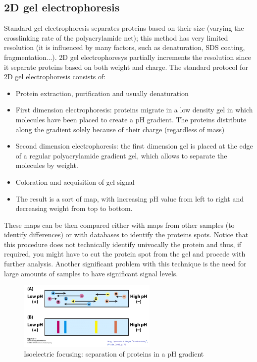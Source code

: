     \subsection{2D gel electrophoresis}
      Standard gel electrophoresis separates proteins based on their size (varying the crosslinking rate of the polyacrylamide net); this method has very limited resolution (it is influenced by many factors, such as denaturation, SDS coating, fragmentation...).
      2D gel electrophoresys partially increments the resolution since it separate proteins based on both weight and charge.
      The standard protocol for 2D gel electrophoresis consists of:
      \begin{itemize}
        \item Protein extraction, purification and usually denaturation
        \item First dimension electrophoresis: proteins migrate in a low density gel in which molecules have been placed to create a pH gradient. The proteins distribute along the gradient solely because of their charge (regardless of mass)
        \item Second dimension electrophoresis: the first dimension gel is placed at the edge of a regular polyacrylamide gradient gel, which allows to separate the molecules by weight. 
        \item Coloration and acquisition of gel signal
        \item The result is a sort of map, with increasing pH value from left to right and decreasing weight from top to bottom.
      \end{itemize}
      These maps can be then compared either with maps from other samples (to identify differences) or with databases to identify the proteins spots. Notice that this procedure does not technically identify univocally the protein and thus, if required, you might have to cut the protein spot from the gel and procede with further analysis. Another significant problem with this technique is the need for large amounts of samples to have significant signal levels.

      \begin{figure}[ht]
      \caption{Isoelectric focusing: separation of proteins in a pH gradient}
      \centering
      \includegraphics[width=0.6\textwidth]{IsoelectricProteinSeparation}
      \end{figure}

